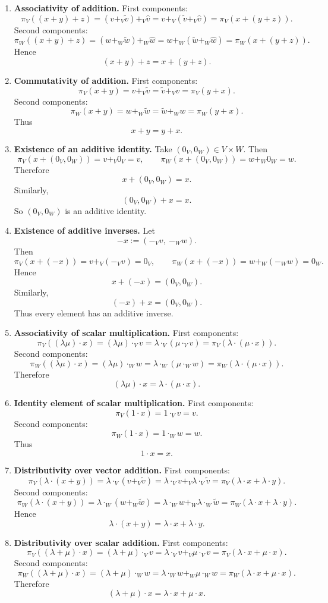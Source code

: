 \documentclass[12pt]{article}
\begin{document}
\begin{enumerate}[label=\textbf{A\arabic*.}]
\item \textbf{Associativity of addition.}  
First components:
\[
\pi_V((x+y)+z)=(v+_V\tilde v)+_V\hat v=v+_V(\tilde v+_V\hat v)=\pi_V(x+(y+z)).
\]
Second components:
\[
\pi_W((x+y)+z)=(w+_W\tilde w)+_W\hat w=w+_W(\tilde w+_W\hat w)=\pi_W(x+(y+z)).
\]
Hence
\[
(x+y)+z=x+(y+z).
\]

\item \textbf{Commutativity of addition.}  
First components:
\[
\pi_V(x+y)=v+_V\tilde v=\tilde v+_V v=\pi_V(y+x).
\]
Second components:
\[
\pi_W(x+y)=w+_W\tilde w=\tilde w+_W w=\pi_W(y+x).
\]
Thus
\[
x+y=y+x.
\]

\item \textbf{Existence of an additive identity.}  
Take \((0_V,0_W)\in V\times W\). Then
\[
\pi_V(x+(0_V,0_W))=v+_V 0_V=v,
\qquad
\pi_W(x+(0_V,0_W))=w+_W 0_W=w.
\]
Therefore
\[
x+(0_V,0_W)=x.
\]
Similarly,
\[
(0_V,0_W)+x=x.
\]
So \((0_V,0_W)\) is an additive identity.

\item \textbf{Existence of additive inverses.}  
Let
\[
-x:=(-_V v,\ -_W w).
\]
Then
\[
\pi_V(x+(-x))=v+_V(-_V v)=0_V,
\qquad
\pi_W(x+(-x))=w+_W(-_W w)=0_W.
\]
Hence
\[
x+(-x)=(0_V,0_W).
\]
Similarly,
\[
(-x)+x=(0_V,0_W).
\]
Thus every element has an additive inverse.

\item \textbf{Associativity of scalar multiplication.}  
First components:
\[
\pi_V((\lambda\mu)\cdot x)=(\lambda\mu)\cdot_V v=\lambda\cdot_V(\mu\cdot_V v)=\pi_V(\lambda\cdot(\mu\cdot x)).
\]
Second components:
\[
\pi_W((\lambda\mu)\cdot x)=(\lambda\mu)\cdot_W w=\lambda\cdot_W(\mu\cdot_W w)=\pi_W(\lambda\cdot(\mu\cdot x)).
\]
Therefore
\[
(\lambda\mu)\cdot x=\lambda\cdot(\mu\cdot x).
\]

\item \textbf{Identity element of scalar multiplication.}  
First components:
\[
\pi_V(1\cdot x)=1\cdot_V v=v.
\]
Second components:
\[
\pi_W(1\cdot x)=1\cdot_W w=w.
\]
Thus
\[
1\cdot x=x.
\]

\item \textbf{Distributivity over vector addition.}  
First components:
\[
\pi_V(\lambda\cdot(x+y))
=
\lambda\cdot_V(v+_V\tilde v)
=
\lambda\cdot_V v+_V\lambda\cdot_V\tilde v
=
\pi_V(\lambda\cdot x+\lambda\cdot y).
\]
Second components:
\[
\pi_W(\lambda\cdot(x+y))
=
\lambda\cdot_W(w+_W\tilde w)
=
\lambda\cdot_W w+_W\lambda\cdot_W\tilde w
=
\pi_W(\lambda\cdot x+\lambda\cdot y).
\]
Hence
\[
\lambda\cdot(x+y)=\lambda\cdot x+\lambda\cdot y.
\]

\item \textbf{Distributivity over scalar addition.}  
First components:
\[
\pi_V((\lambda+\mu)\cdot x)
=
(\lambda+\mu)\cdot_V v
=
\lambda\cdot_V v+_V\mu\cdot_V v
=
\pi_V(\lambda\cdot x+\mu\cdot x).
\]
Second components:
\[
\pi_W((\lambda+\mu)\cdot x)
=
(\lambda+\mu)\cdot_W w
=
\lambda\cdot_W w+_W\mu\cdot_W w
=
\pi_W(\lambda\cdot x+\mu\cdot x).
\]
Therefore
\[
(\lambda+\mu)\cdot x=\lambda\cdot x+\mu\cdot x.
\]
\end{enumerate}
\end{document}
